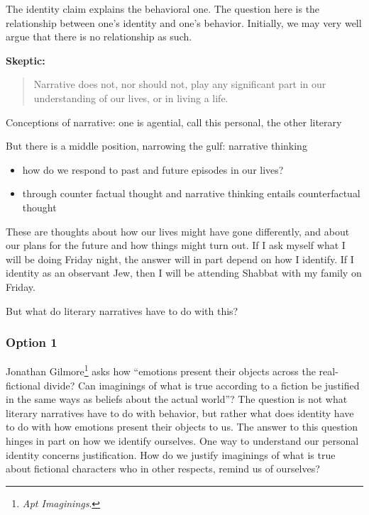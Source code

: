 \documentclass[phdthesis,12pt,final]{wuthesis}
\theoremstyle{definition}
\theoremstyle{definition}
\theoremstyle{definition}
\theoremstyle{definition}
\theoremstyle{remark}
\begin{document}
The identity claim explains the behavioral one. The question here is the relationship between one's identity and one's behavior. Initially, we may very well argue that there is no relationship as such.

\textbf{Skeptic:}

\begin{quote}
Narrative does not, nor should not, play any significant part in our understanding of our lives, or in living a life.
\end{quote}

Conceptions of narrative: one is agential, call this personal, the other literary

But there is a middle position, narrowing the gulf: narrative thinking

\begin{itemize}
\item
  how do we respond to past and future episodes in our lives?
\item
  through counter factual thought and narrative thinking entails counterfactual thought
\end{itemize}

These are thoughts about how our lives might have gone differently, and about our plans for the future and how things might turn out. If I ask myself what I will be doing Friday night, the answer will in part depend on how I identify. If I identity as an observant Jew, then I will be attending Shabbat with my family on Friday.

But what do literary narratives have to do with this?

\subsubsection*{Option 1}\label{option-1}

Jonathan Gilmore\footnote{\emph{Apt {Imaginings}}.} asks how ``emotions present their objects across the real-fictional divide? Can imaginings of what is true according to a fiction be justified in the same ways as beliefs about the actual world''? The question is not what literary narratives have to do with behavior, but rather what does identity have to do with how emotions present their objects to us. The answer to this question hinges in part on how we identify ourselves. One way to understand our personal identity concerns justification. How do we justify imaginings of what is true about fictional characters who in other respects, remind us of ourselves?
\end{document}
